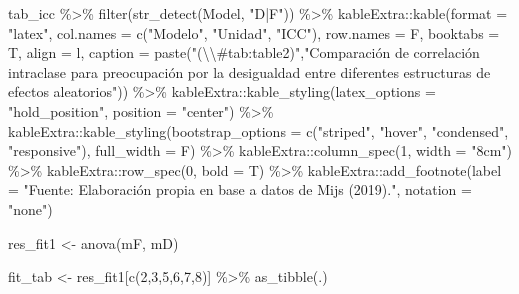 \documentclass[
  12pt,
  a4paper,
]{article}
\newenvironment{Shaded}{\begin{snugshade}}{\end{snugshade}}
\newcommand{\AttributeTok}[1]{\textcolor[rgb]{0.77,0.63,0.00}{#1}}
\newcommand{\DecValTok}[1]{\textcolor[rgb]{0.00,0.00,0.81}{#1}}
\newcommand{\FunctionTok}[1]{\textcolor[rgb]{0.00,0.00,0.00}{#1}}
\newcommand{\NormalTok}[1]{#1}
\newcommand{\OtherTok}[1]{\textcolor[rgb]{0.56,0.35,0.01}{#1}}
\newcommand{\SpecialCharTok}[1]{\textcolor[rgb]{0.00,0.00,0.00}{#1}}
\newcommand{\StringTok}[1]{\textcolor[rgb]{0.31,0.60,0.02}{#1}}
\begin{document}
\begin{Shaded}
\begin{Highlighting}[]
\NormalTok{tab\_icc }\SpecialCharTok{\%\textgreater{}\%} 
  \FunctionTok{filter}\NormalTok{(}\FunctionTok{str\_detect}\NormalTok{(Model, }\StringTok{"D|F"}\NormalTok{)) }\SpecialCharTok{\%\textgreater{}\%} 
\NormalTok{  kableExtra}\SpecialCharTok{::}\FunctionTok{kable}\NormalTok{(}\AttributeTok{format =} \StringTok{"latex"}\NormalTok{, }
                    \AttributeTok{col.names =} \FunctionTok{c}\NormalTok{(}\StringTok{"Modelo"}\NormalTok{, }\StringTok{"Unidad"}\NormalTok{, }\StringTok{"ICC"}\NormalTok{),}
                    \AttributeTok{row.names =}\NormalTok{ F,}
                    \AttributeTok{booktabs =}\NormalTok{ T, }\AttributeTok{align =} \StringTok{\textquotesingle{}l\textquotesingle{}}\NormalTok{,}
                    \AttributeTok{caption =} \FunctionTok{paste}\NormalTok{(}\StringTok{"(}\SpecialCharTok{\textbackslash{}\textbackslash{}}\StringTok{\#tab:table2)"}\NormalTok{,}\StringTok{"Comparación de correlación intraclase para preocupación por la desigualdad entre diferentes estructuras de efectos aleatorios"}\NormalTok{)) }\SpecialCharTok{\%\textgreater{}\%} 
\NormalTok{  kableExtra}\SpecialCharTok{::}\FunctionTok{kable\_styling}\NormalTok{(}\AttributeTok{latex\_options =} \StringTok{"hold\_position"}\NormalTok{, }
                            \AttributeTok{position =} \StringTok{"center"}\NormalTok{) }\SpecialCharTok{\%\textgreater{}\%}
\NormalTok{  kableExtra}\SpecialCharTok{::}\FunctionTok{kable\_styling}\NormalTok{(}\AttributeTok{bootstrap\_options =} \FunctionTok{c}\NormalTok{(}\StringTok{"striped"}\NormalTok{, }\StringTok{"hover"}\NormalTok{, }\StringTok{"condensed"}\NormalTok{, }\StringTok{"responsive"}\NormalTok{), }\AttributeTok{full\_width =}\NormalTok{ F) }\SpecialCharTok{\%\textgreater{}\%} 
\NormalTok{  kableExtra}\SpecialCharTok{::}\FunctionTok{column\_spec}\NormalTok{(}\DecValTok{1}\NormalTok{, }\AttributeTok{width =} \StringTok{"8cm"}\NormalTok{) }\SpecialCharTok{\%\textgreater{}\%}
\NormalTok{  kableExtra}\SpecialCharTok{::}\FunctionTok{row\_spec}\NormalTok{(}\DecValTok{0}\NormalTok{, }\AttributeTok{bold =}\NormalTok{ T) }\SpecialCharTok{\%\textgreater{}\%} 
\NormalTok{  kableExtra}\SpecialCharTok{::}\FunctionTok{add\_footnote}\NormalTok{(}\AttributeTok{label =} \StringTok{"Fuente: Elaboración propia en base a datos de Mijs (2019)."}\NormalTok{, }\AttributeTok{notation =} \StringTok{"none"}\NormalTok{)}
  
 


\NormalTok{res\_fit1 }\OtherTok{\textless{}{-}} \FunctionTok{anova}\NormalTok{(mF, mD)}

\NormalTok{fit\_tab }\OtherTok{\textless{}{-}}\NormalTok{ res\_fit1[}\FunctionTok{c}\NormalTok{(}\DecValTok{2}\NormalTok{,}\DecValTok{3}\NormalTok{,}\DecValTok{5}\NormalTok{,}\DecValTok{6}\NormalTok{,}\DecValTok{7}\NormalTok{,}\DecValTok{8}\NormalTok{)] }\SpecialCharTok{\%\textgreater{}\%} \FunctionTok{as\_tibble}\NormalTok{(.)}


\end{Highlighting}
\end{Shaded}
\end{document}
